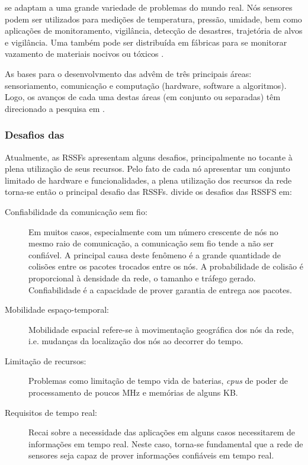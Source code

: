 \rssfs se adaptam a uma grande variedade de problemas do mundo real. Nós sensores podem ser utilizados para medições de temperatura, pressão, umidade, bem como aplicações de monitoramento, vigilância, detecção de desastres, trajetória de alvos e vigilância. Uma \rssf também pode ser distribuída em fábricas para se monitorar vazamento de materiais nocivos ou tóxicos \cite{Aboelaze2005}.


As bases para o desenvolvmento das \rssfs advêm de três principais áreas: sensoriamento, comunicação e computação (hardware, software a algoritmos). Logo, os avanços de cada uma destas áreas (em conjunto ou separadas) têm direcionado a pesquisa em \rssf\cite{Chong2003}. 

\subsubsection{Desafios das \rssfs}

Atualmente, as RSSFs apresentam alguns desafios, principalmente no tocante à plena utilização de seus recursos. Pelo fato de cada nó apresentar um conjunto limitado de hardware e funcionalidades, a plena utilização dos recursos da rede torna-se então o principal desafio das RSSFs.
\cite{Dressler2007} divide os desafios das RSSFS em:

\begin{description}
\item [Confiabilidade da comunicação sem fio:] Em muitos casos, especialmente com um número crescente de nós no mesmo raio de comunicação, a comunicação sem fio  tende a não ser confiável. A principal causa deste fenômeno é a grande quantidade de colisões entre os pacotes trocados entre os nós. A probabilidade de colisão é proporcional à densidade da rede, o tamanho e tráfego gerado. Confiabilidade é a capacidade de prover garantia de entrega aos pacotes.
			
\item [Mobilidade espaço-temporal:] Mobilidade espacial refere-se à movimentação geográfica dos nós da rede, i.e. mudanças da localização dos nós ao decorrer do tempo.
			
\item [Limitação de recursos:] Problemas como limitação de tempo vida de baterias, \emph{cpus} de poder de processamento de poucos MHz e memórias de alguns KB.
			
\item [Requisitos de tempo real:] Recai sobre a necessidade das aplicações em alguns casos necessitarem de informações em tempo real. Neste caso, torna-se fundamental que a rede de sensores seja capaz de prover informações confiáveis em tempo real.	
\end{description}

